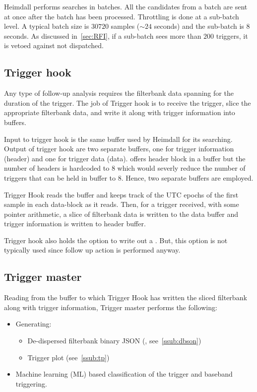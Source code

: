 \par Heimdall performs searches in batches. All the candidates from a batch are sent at once after the batch has been processed.
Throttling is done at a sub-batch level. A typical batch size is $30720$ samples ($\sim 24$ seconds) and the sub-batch is $8$ seconds.
As discussed in~\autoref{sec:RFI}, if a sub-batch sees more than $200$ triggers, it is vetoed against not dispatched.

\subsection {Trigger hook}

\par Any type of follow-up analysis requires the filterbank data spanning for the duration of the trigger. The job of Trigger hook is to receive the \dbson trigger, slice the appropriate filterbank data, and write it along with trigger information into \dada buffers.

\par Input to trigger hook is the same \dada buffer used by Heimdall for its searching. Output of trigger hook are two separate \dada buffers, one for trigger information (header) and one for trigger data (data). 
\dada offers header block in a buffer but the number of headers is hardcoded to $8$ which would severly reduce the number of triggers that can be held in buffer to $8$.  Hence, two separate buffers are employed.

\par Trigger Hook reads the buffer and keeps track of the UTC epochs of the first sample in each data-block as it reads. 
Then, for a trigger received, with some pointer arithmetic, a slice of filterbank data is written to the data \dada buffer and trigger information is written to header \dada buffer.

\par Trigger hook also holds the option to write out a \fbson. But, this option is not typically used since follow up action is performed anyway.

\subsection {Trigger master}

\par Reading from the buffer to which Trigger Hook has written the sliced filterbank along with trigger information, Trigger master performs the following:
\begin{itemize}
	\item Generating: 
		\begin{itemize}
			\item De-dispersed filterbank binary JSON (\dbson, see~\autoref{ssub:dbson})
			\item Trigger plot (see~\autoref{ssub:tp})
		\end{itemize}
	\item Machine learning (ML) based classification of the trigger and baseband triggering.
\end{itemize}

